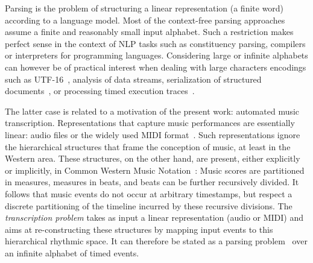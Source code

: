 %
%
Parsing is the problem
of structuring a linear representation
(a finite word) according to a language model. %
%
Most of the context-free parsing approaches~\cite{GruneJacobs08parsing}
assume a finite and reasonably small input alphabet. %
Such a restriction makes perfect sense in the context of
NLP tasks such as constituency parsing, 
compilers or interpreters for programming languages.
Considering large or infinite alphabets can however be of
practical interest when dealing with large characters encodings such as UTF-16~\cite{dAntoni21CACM},
%
analysis of data streams, serialization of structured documents~\cite{Segoufin06csl,NevenSchwentickVianu04FSMinfinite},
or processing timed execution traces~\cite{Bouyer03algebraic}.
%

The latter case is related to a motivation  of  the present work: 
automated music transcription. Representations that capture  music performances
are essentially linear:
audio files or the widely used
MIDI format~\cite{Selfridge-Field97beyondMIDI}. %
Such representations ignore the hierarchical structures that frame the
conception of music, at least in the Western area. These structures, on the other hand,
are present, either explicitly  or implicitly,
in Common Western Music Notation~\cite{Gould11Notation}:
Music scores are partitioned in measures,
measures in beats, and beats can be further recursively divided.
It follows that music events do not occur at arbitrary timestamps,
but respect a discrete partitioning of the  timeline incurred by
these recursive divisions.
The \emph{transcription problem} takes
as input a linear representation (audio or MIDI) and aims at re-constructing
these structures
by mapping input events to this hierarchical rhythmic space.
It can therefore be stated as a parsing problem~\cite{foscarin:hal-01988990}
over an infinite alphabet of timed events.

